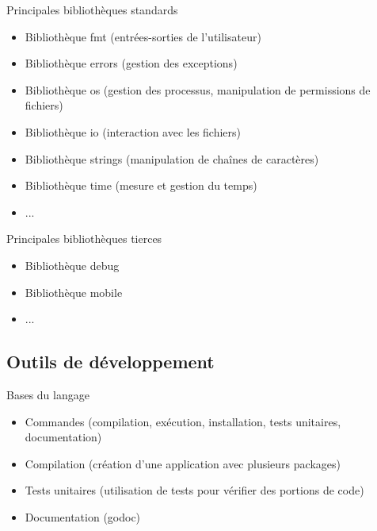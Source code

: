 \documentclass{beamer}
\begin{document}
\begin{frame}
\begin{block}{Principales bibliothèques standards} 
	\begin{itemize}
		[circle]
		\item Bibliothèque fmt (entrées-sorties de l'utilisateur)
		\item Bibliothèque errors (gestion des exceptions)
		\item Bibliothèque os (gestion des processus, manipulation de permissions de fichiers)
		\item Bibliothèque io (interaction avec les fichiers)
		\item Bibliothèque strings (manipulation de chaînes de caractères)
		\item Bibliothèque time (mesure et gestion du temps)
		\item ...
	\end{itemize}
\end{block}

\begin{block}{Principales bibliothèques tierces} 
	\begin{itemize}
		[circle]
		\item Bibliothèque debug
		\item Bibliothèque mobile
		\item ...
	\end{itemize}
\end{block}
\end{frame}

\subsection{Outils de développement}

\begin{frame}
\begin{block}{Bases du langage} 
	\begin{itemize}
		[circle]
		\item Commandes (compilation, exécution, installation, tests unitaires, documentation)
		\item Compilation (création d'une application avec plusieurs packages)
		\item Tests unitaires (utilisation de tests pour vérifier des portions de code)
		\item Documentation (godoc)
		
	\end{itemize}
\end{block}
\end{frame}
\end{document}
